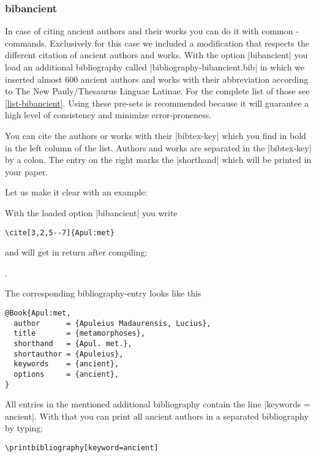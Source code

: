 \documentclass[a4paper,
10pt,
greek,
french,
spanish,
italian,
ngerman,
english
]{ltxdoc}
\begin{document}
\subsubsection{bibancient}\label{bibancient}
In case of citing ancient authors and their works you can do it with common -commands.
Exclusively for this case we included a modification that respects the different citation of ancient authors and works.
With the option |bibancient| you load an additional bibliography called |bibliography-bibancient.bib| in which we inserted almost 600 ancient authors and works with their abbreviation according to The New Pauly/Thesaurus Linguae Latinae.
For the complete list of those see \cref{list-bibancient}.
Using these pre-sets is recommended because it will guarantee a high level of consistency and minimize error-proneness.

You can cite the authors or works with their |bibtex-key| which you find in bold in the left column of the list. 
Authors and works are separated in the |bibtex-key| by a colon.
The entry on the right marks the |shorthand| which will be printed in your paper.

Let us make it clear with an example:
\begin{refsection}
With the loaded option |bibancient| you write  

\begin{lstlisting}
\cite[3,2,5--7]{Apul:met} 
\end{lstlisting}

and will get in return after compiling: 

\cite[3,2,5--7]{Apul:met}.
\end{refsection}

The corresponding bibliography-entry looks like this
\begin{lstlisting}[style=bibentry,label=Apul:met,caption={{@}Book\{Apul:met,…\} }]
@Book{Apul:met,
  author      = {Apuleius Madaurensis, Lucius},
  title       = {metamorphoses},
  shorthand   = {Apul. met.},
  shortauthor = {Apuleius},
  keywords    = {ancient},
  options     = {ancient},
}
\end{lstlisting}
All entries in the mentioned additional bibliography contain the line |keywords = {ancient}|.
With that you can print all ancient authors in a separated bibliography by typing:
\begin{lstlisting}
\printbibliography[keyword=ancient]
\end{lstlisting}
\end{document}
